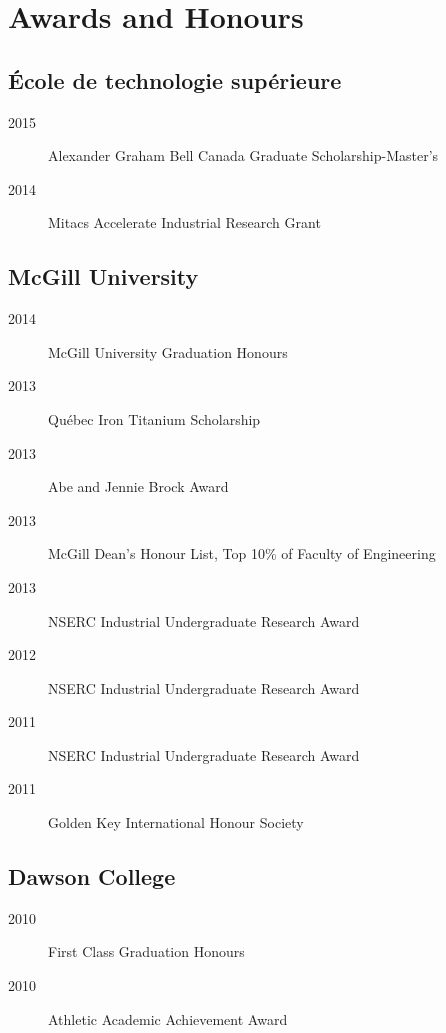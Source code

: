 \documentclass{article}
\begin{document}
\section{Awards and Honours}
\subsection{École de technologie supérieure}
\begin{description}
  \item[2015] Alexander Graham Bell Canada Graduate Scholarship-Master's
  \item[2014] Mitacs Accelerate Industrial Research Grant
\end{description}

\subsection{McGill University}
\begin{description}
  \item[2014] McGill University Graduation Honours
  \item[2013] Québec Iron Titanium Scholarship
  \item[2013] Abe and Jennie Brock Award
  \item[2013] McGill Dean's Honour List, Top 10\% of Faculty of Engineering
  \item[2013] NSERC Industrial Undergraduate Research Award
  \item[2012] NSERC Industrial Undergraduate Research Award
  \item[2011] NSERC Industrial Undergraduate Research Award
  \item[2011] Golden Key International Honour Society
\end{description}

\subsection{Dawson College}
\begin{description}
  \item[2010] First Class Graduation Honours
  \item[2010] Athletic Academic Achievement Award
\end{description}
\end{document}
